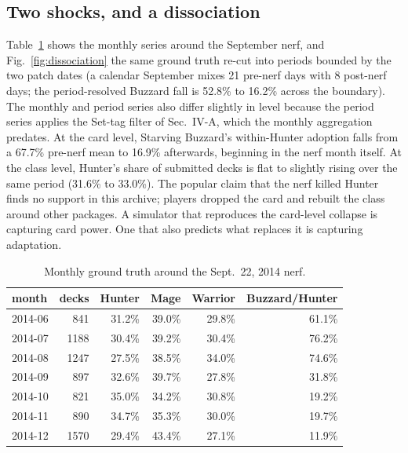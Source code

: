 \documentclass[conference]{IEEEtran}
\begin{document}
\subsection{Two shocks, and a dissociation}
\label{sec:shocks}
Table~\ref{tab:buzzard_series} shows the monthly series around the
September nerf, and Fig.~\ref{fig:dissociation} the same ground
truth re-cut into periods bounded by the two patch dates (a calendar
September mixes 21 pre-nerf days with 8 post-nerf days; the
period-resolved Buzzard fall is 52.8\% to 16.2\% across the
boundary). The monthly and period series also differ slightly in
level because the period series applies the Set-tag filter of
Sec.~IV-A, which the monthly aggregation predates. At the card
level,
Starving Buzzard's within-Hunter adoption falls from a 67.7\%
pre-nerf mean to 16.9\% afterwards, beginning in the nerf month
itself. At the class level, Hunter's share of submitted decks is
flat to slightly rising over the same period (31.6\% to 33.0\%).
The popular claim that the nerf killed Hunter finds no support in
this archive; players dropped the card and rebuilt the class around
other packages. A simulator that reproduces the card-level collapse
is capturing card power. One that also predicts what replaces it is
capturing adaptation.

\begin{table}[t]
\caption{Monthly ground truth around the Sept.~22, 2014 nerf.}
\label{tab:buzzard_series}
\centering
\begin{tabular}{lrrrrr}
\toprule
month & decks & Hunter & Mage & Warrior & Buzzard/Hunter\\
\midrule
2014-06 &  841 & 31.2\% & 39.0\% & 29.8\% & 61.1\%\\
2014-07 & 1188 & 30.4\% & 39.2\% & 30.4\% & 76.2\%\\
2014-08 & 1247 & 27.5\% & 38.5\% & 34.0\% & 74.6\%\\
2014-09 &  897 & 32.6\% & 39.7\% & 27.8\% & 31.8\%\\
2014-10 &  821 & 35.0\% & 34.2\% & 30.8\% & 19.2\%\\
2014-11 &  890 & 34.7\% & 35.3\% & 30.0\% & 19.7\%\\
2014-12 & 1570 & 29.4\% & 43.4\% & 27.1\% & 11.9\%\\
\bottomrule
\end{tabular}
\end{table}
\end{document}
